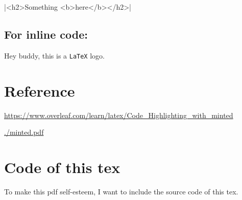 \documentclass{article}
\begin{document}
|<h2>Something <b>here</b></h2>|

\subsection{ For  inline code:}

Hey buddy, this is a \texttt{\LaTeX} logo. 

\section{Reference}

\url{https://www.overleaf.com/learn/latex/Code_Highlighting_with_minted}

\url{./minted.pdf}

\section{Code of this tex}
To make this pdf self-esteem, I want to include the source code of this tex.

\inputminted[bgcolor=bg,breaklines]{latex}{./main.tex}
\end{document}
